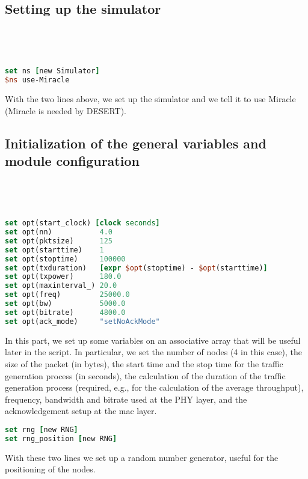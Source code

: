 \documentclass[11pt]{article}
\begin{document}
\subsection{Setting up the simulator}
\ 
{\scriptsize\tt
\begin{lstlisting}[language=tcl]
set ns [new Simulator]
$ns use-Miracle
\end{lstlisting}
}

With the two lines above, we set up the simulator and we tell it to use Miracle (Miracle is needed by DESERT).

\subsection{Initialization of the general variables and module configuration}
\ 
{\scriptsize\tt
\begin{lstlisting}[language=tcl]
set opt(start_clock) [clock seconds]
set opt(nn)           4.0
set opt(pktsize)      125
set opt(starttime)    1	
set opt(stoptime)     100000 
set opt(txduration)   [expr $opt(stoptime) - $opt(starttime)]
set opt(txpower)      180.0
set opt(maxinterval_) 20.0
set opt(freq)         25000.0
set opt(bw)           5000.0
set opt(bitrate)      4800.0
set opt(ack_mode)     "setNoAckMode"
\end{lstlisting}
}

In this part, we set up some variables on an associative array that will be useful later in the script. 
In particular, we set the number of nodes (4 in this case), the size 
of the packet (in bytes), the start time and the stop time for the traffic generation process (in seconds), the calculation of the duration of the traffic generation process (required, e.g., for the calculation of the average throughput), frequency, bandwidth and bitrate used at the PHY layer, and the acknowledgement setup at the mac layer.\\	

{\scriptsize
\begin{lstlisting}[language=tcl]
set rng [new RNG]
set rng_position [new RNG]
\end{lstlisting}
}

With these two lines we set up a random number generator, useful for the positioning of the nodes.

\clearpage
\end{document}
